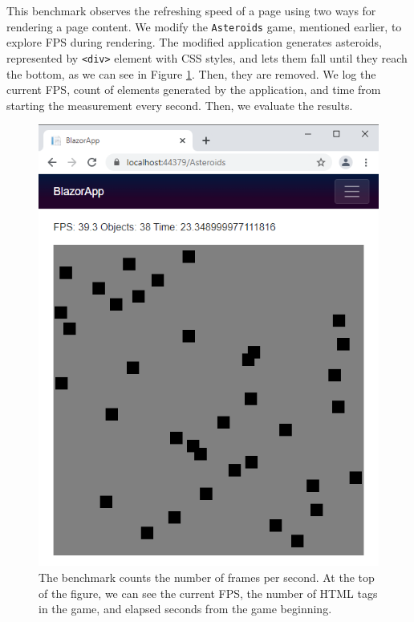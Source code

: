 This benchmark observes the refreshing speed of a page using two ways for rendering a page content.
We modify the \texttt{Asteroids} game, mentioned earlier, to explore FPS during rendering.
The modified application generates asteroids, represented by \texttt{<div>} element with CSS styles, and lets them fall until they reach the bottom, as we can see in Figure \ref{img33:benchmark}.
Then, they are removed.
We log the current FPS, count of elements generated by the application, and time from starting the measurement every second.
Then, we evaluate the results.
\par
\begin{figure}[t]\centering
\includegraphics[scale=0.7]{./img/BenchmarkRendering}
\caption{The benchmark counts the number of frames per second. At the top of the figure, we can see the current FPS, the number of HTML tags in the game, and elapsed seconds from the game beginning.}
\label{img33:benchmark}
\end{figure} 
\par
